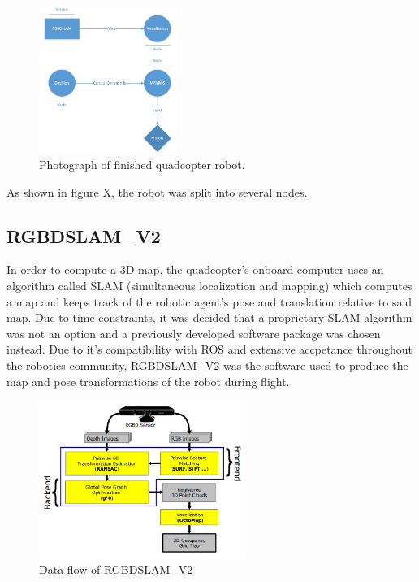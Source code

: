\documentclass[letterpaper, oneside, 10pt]{report}
\begin{document}
\begin{figure}[h!]
 \caption{Photograph of finished quadcopter robot.}
 \centering
   \includegraphics[width=0.4\textwidth]{images/ros_arch}
\end{figure}

As shown in figure X, the robot was split into several nodes.

\subsection{RGBDSLAM\_V2}
\noindent In order to compute a 3D map, the quadcopter's onboard computer uses an algorithm called SLAM (simultaneous localization and mapping) which computes a map and keeps track of the robotic agent's pose and translation relative to said map. Due to time constraints, it was decided that a proprietary SLAM algorithm was not an option and a previously developed software package was chosen instead. Due to it's compatibility with ROS and extensive accpetance throughout the robotics community, RGBDSLAM_V2 was the software used to produce the map and pose transformations of the robot during flight.

\begin{figure}[h]
 \caption{Data flow of RGBDSLAM_V2}
 \centering
   \includegraphics[width=0.6\textwidth]{images/rgbdslam}
\end{figure}
\end{document}
